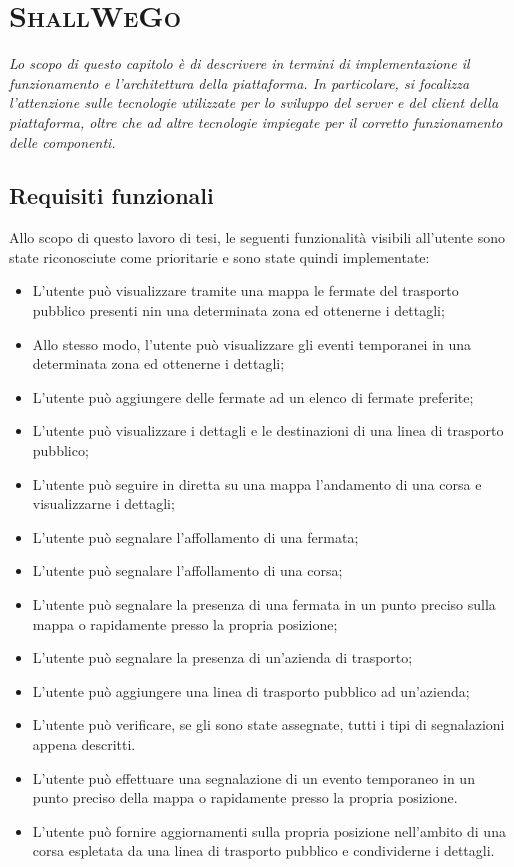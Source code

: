 \chapter{\textsc{ShallWeGo}}
\newenvironment{code}{\captionsetup{type=listing}}{}

\begin{citazione}
    \textit{Lo scopo di questo capitolo è di descrivere in termini di implementazione il funzionamento e l'architettura della piattaforma. In particolare, si focalizza l'attenzione sulle tecnologie utilizzate per lo sviluppo del server e del client della piattaforma, oltre che ad altre tecnologie impiegate per il corretto funzionamento delle componenti.}
\end{citazione}

\newpage

\section{Requisiti funzionali}
    Allo scopo di questo lavoro di tesi, le seguenti funzionalità visibili all'utente sono state riconosciute come prioritarie e sono state quindi implementate:

    \begin{itemize}
        \item L'utente può visualizzare tramite una mappa le fermate del trasporto pubblico presenti nin una determinata zona ed ottenerne i dettagli;
        \item Allo stesso modo, l'utente può visualizzare gli eventi temporanei in una determinata zona ed ottenerne i dettagli;
        \item L'utente può aggiungere delle fermate ad un elenco di fermate preferite;
        \item L'utente può visualizzare i dettagli e le destinazioni di una linea di trasporto pubblico;
        \item L'utente può seguire in diretta su una mappa l'andamento di una corsa e visualizzarne i dettagli;
        \item L'utente può segnalare l'affollamento di una fermata;
        \item L'utente può segnalare l'affollamento di una corsa;
        \item L'utente può segnalare la presenza di una fermata in un punto preciso sulla mappa o rapidamente presso la propria posizione;
        \item L'utente può segnalare la presenza di un'azienda di trasporto;
        \item L'utente può aggiungere una linea di trasporto pubblico ad un'azienda;
        \item L'utente può verificare, se gli sono state assegnate, tutti i tipi di segnalazioni appena descritti.
        \item L'utente può effettuare una segnalazione di un evento temporaneo in un punto preciso della mappa o rapidamente presso la propria posizione.
        \item L'utente può fornire aggiornamenti sulla propria posizione nell'ambito di una corsa espletata da una linea di trasporto pubblico e condividerne i dettagli.
    \end{itemize}

